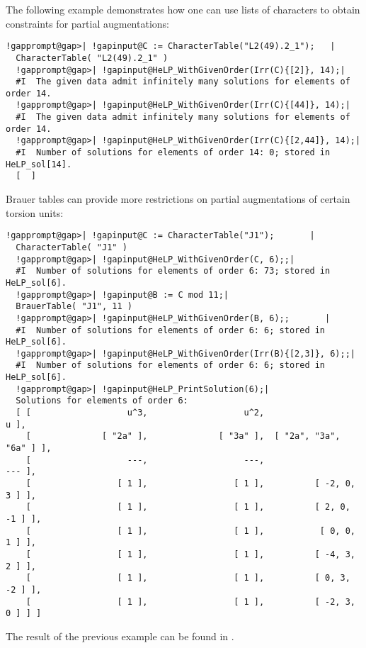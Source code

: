 \documentclass[a4paper,11pt]{report}
\begin{document}
{{ The following example demonstrates how one can use lists of characters to
obtain constraints for partial augmentations: 
\begin{Verbatim}[commandchars=!@|,fontsize=\small,frame=single,label=Example]
  !gapprompt@gap>| !gapinput@C := CharacterTable("L2(49).2_1");   |
  CharacterTable( "L2(49).2_1" )
  !gapprompt@gap>| !gapinput@HeLP_WithGivenOrder(Irr(C){[2]}, 14);|
  #I  The given data admit infinitely many solutions for elements of order 14.
  !gapprompt@gap>| !gapinput@HeLP_WithGivenOrder(Irr(C){[44]}, 14);|
  #I  The given data admit infinitely many solutions for elements of order 14.
  !gapprompt@gap>| !gapinput@HeLP_WithGivenOrder(Irr(C){[2,44]}, 14);|
  #I  Number of solutions for elements of order 14: 0; stored in HeLP_sol[14].
  [  ]
\end{Verbatim}
 Brauer tables can provide more restrictions on partial augmentations of
certain torsion units: 
\begin{Verbatim}[commandchars=!@|,fontsize=\small,frame=single,label=Example]
  !gapprompt@gap>| !gapinput@C := CharacterTable("J1");       |
  CharacterTable( "J1" )
  !gapprompt@gap>| !gapinput@HeLP_WithGivenOrder(C, 6);;|
  #I  Number of solutions for elements of order 6: 73; stored in HeLP_sol[6].
  !gapprompt@gap>| !gapinput@B := C mod 11;|
  BrauerTable( "J1", 11 )
  !gapprompt@gap>| !gapinput@HeLP_WithGivenOrder(B, 6);;       |
  #I  Number of solutions for elements of order 6: 6; stored in HeLP_sol[6].
  !gapprompt@gap>| !gapinput@HeLP_WithGivenOrder(Irr(B){[2,3]}, 6);;|
  #I  Number of solutions for elements of order 6: 6; stored in HeLP_sol[6].
  !gapprompt@gap>| !gapinput@HeLP_PrintSolution(6);|
  Solutions for elements of order 6:
  [ [                   u^3,                   u^2,                     u ],
    [              [ "2a" ],              [ "3a" ],  [ "2a", "3a", "6a" ] ],
    [                   ---,                   ---,                   --- ],
    [                 [ 1 ],                 [ 1 ],          [ -2, 0, 3 ] ],
    [                 [ 1 ],                 [ 1 ],          [ 2, 0, -1 ] ],
    [                 [ 1 ],                 [ 1 ],           [ 0, 0, 1 ] ],
    [                 [ 1 ],                 [ 1 ],          [ -4, 3, 2 ] ],
    [                 [ 1 ],                 [ 1 ],          [ 0, 3, -2 ] ],
    [                 [ 1 ],                 [ 1 ],          [ -2, 3, 0 ] ] ]
\end{Verbatim}
 The result of the previous example can be found in \cite{BJK}. 

}}
\end{document}
